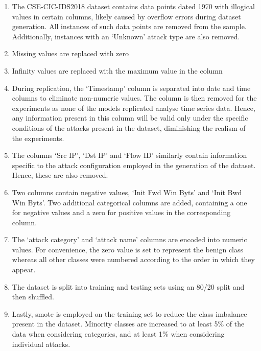 \begin{enumerate}
      \item The CSE-CIC-IDS2018 dataset contains data points dated 1970 with illogical
            values in certain columns, likely caused by overflow errors during dataset
            generation. All instances of such data points are removed from the sample.
            Additionally, instances with an `Unknown' attack type are also removed.
      \item Missing values are replaced with zero
      \item Infinity values are replaced with the maximum value in the column
      \item During replication, the `Timestamp' column is separated into date and time
            columns to eliminate non-numeric values. The column is then removed for the
            experiments as none of the models replicated analyse time series data. Hence,
            any information present in this column will be valid only under the specific
            conditions of the attacks present in the dataset, diminishing the realism of
            the experiments.
      \item The columns `Src IP', `Dst IP' and `Flow ID' similarly contain information
            specific to the attack configuration employed in the generation of the dataset.
            Hence, these are also removed.
      \item Two columns contain negative values, `Init Fwd Win Byts' and `Init Bwd Win
            Byts'. Two additional categorical columns are added, containing a one for
            negative values and a zero for positive values in the corresponding column.
      \item The `attack category' and `attack name' columns are encoded into numeric
            values. For convenience, the zero value is set to represent the benign class
            whereas all other classes were numbered according to the order in which they
            appear.
      \item The dataset is split into training and testing sets using an 80/20 split and
            then shuffled.
      \item Lastly, \gls{smote} is employed on the training set to reduce the class
            imbalance present in the dataset. Minority classes are increased to at least
            5\% of the data when considering categories, and at least 1\% when considering
            individual attacks.
\end{enumerate}

